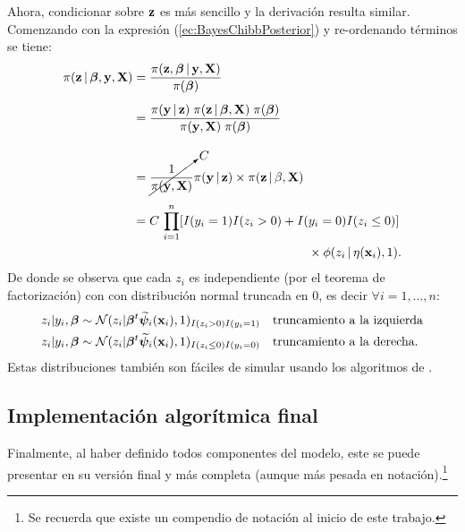 \documentclass[../Main/Main.tex]{subfiles}
\begin{document}
Ahora, condicionar sobre $\mathbf{z}$ es más sencillo y la derivación resulta similar. Comenzando con la expresión (\ref{ec:BayesChibbPosterior}) y re-ordenando términos se tiene:
\begin{align}
	\pi(\mathbf{z}\,|\,\bm{\beta},\mathbf{y},\mathbf{X})
	& = \dfrac{\pi(\mathbf{z}, \bm{\beta}\,|\,\mathbf{y}, \mathbf{X})}{\pi(\bm{\beta})} \nonumber \\[5pt]
	& = \dfrac{\pi(\mathbf{y}\,|\,\mathbf{z})\;\pi(\mathbf{z}\,|\,\bm{\beta},\mathbf{X}) \; \pi(\bm{\beta})}			{\pi(\mathbf{y}, \mathbf{X}) \; \pi(\bm{\beta})} \nonumber \\[10pt]
	& = \cancelto{C}{\dfrac{1}{\pi(\mathbf{y}, \mathbf{X})}}\pi(\mathbf{y}\,|\,\mathbf{z}) \times \pi(\mathbf{z}\,|\,\beta,\mathbf{X}) \nonumber \\[5pt]
	& = C \, \prod_{i = 1}^n[I(y_i = 1)I(z_i > 0) + I(y_i = 0)I(z_i \leq 0)] \nonumber\\
	&\qquad\qquad\qquad\qquad\qquad\qquad\qquad\times\phi(z_i\,|\,\eta(\mathbf{x}_i),1). \label{ec:BayesChibbZCond}
\end{align}
De donde se observa que cada $z_i$ es independiente (por el teorema de factorización) con con distribución normal truncada en $0$, es decir $\forall i=1,\ldots,n$:
\begin{align}
	z_i|y_i,\bm{\beta} &\sim \mathcal{N}(z_i|\bm{\beta}^t\widetilde{\bm{\psi}}_i(\mathbf{x}_i),1)_{I(z_i>0)I(y_i = 1)} \quad \text{truncamiento a la izquierda} \label{ec:SimZ}\\
	z_i|y_i,\bm{\beta} &\sim \mathcal{N}(z_i|\bm{\beta}^t\widetilde{\bm{\psi}}_i(\mathbf{x}_i),1)_{I(z_i\leq0)I(y_i = 0)} \quad \text{truncamiento a la derecha}. \nonumber
\end{align}
Estas distribuciones también son fáciles de simular usando los algoritmos de \citet{devroye1986non}.

\subsection{Implementación algorítmica final} \label{sec:ModFinal}
Finalmente, al haber definido todos componentes del modelo, este se puede presentar en su versión final y más completa (aunque más pesada en notación).\footnote{Se recuerda que existe un compendio de notación al inicio de este trabajo.}
\end{document}
